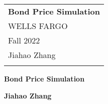\documentclass[a4paper,11pt]{article} %
\begin{document}
		
		\thispagestyle{empty} %
		
		\begin{tabular}{p{15.5cm}} %
			{\large \bf Bond Price Simulation} \\
			WELLS FARGO \\ Fall 2022  \\ Jiahao Zhang\\
			\hline %
			\\
		\end{tabular} %
		
		\vspace*{0.3cm} %
		
		\begin{center} %
			{\Large \bf Bond Price Simulation} %
			\vspace{2mm}
			
			{\bf Jiahao Zhang} %
			
		\end{center}  
		
		\vspace{0.4cm}
		
		
		
\end{document}
